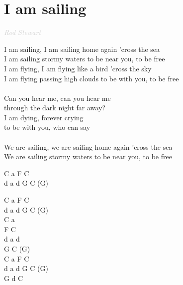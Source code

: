 \documentclass[a5paper, 10pt]{book}
\begin{document}
\section{I am sailing}\textcolor{lightgray}{\textit{Rod Stewart
  }}\vspace*{2mm}\\
\begin{minipage}[t]{0.80\textwidth}
  I am sailing, I am sailing home again 'cross the sea\\
  I am sailing stormy waters to be near you, to be free\vspace*{2mm}
  \\
  I am flying, I am flying like a bird 'cross the sky\\
  I am flying passing high clouds to be with you, to be free\\
  \\
  \hspace*{5mm}Can you hear me, can you hear me \\
  \hspace*{5mm}through the dark night far away?\\
  \hspace*{5mm}I am dying, forever crying \\
  \hspace*{5mm}to be with you, who can say\\
  \\
  We are sailing, we are sailing home again 'cross the sea\\
  We are sailing stormy waters to be near you, to be free\\
\end{minipage}
\begin{minipage}[t]{0.2\textwidth}
  C a F C\\
  d a d G C (G)\vspace*{2mm}

  C a F C\\
  d a d G C (G)\\

  C a\\ F C\\
  d a d\\ G C (G)\\

  C a F C\\
  d a d G C (G)\\
  G d C\\
\end{minipage}

\newpage
\end{document}
